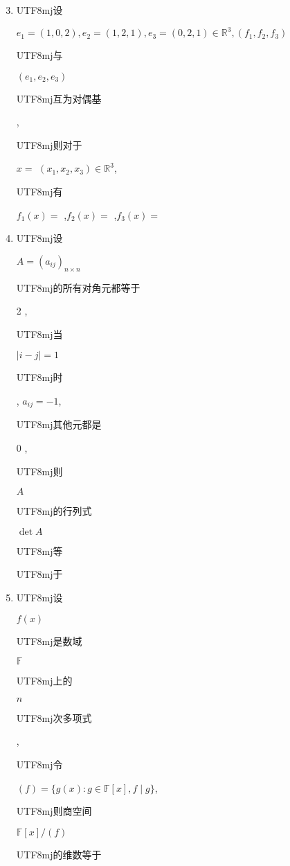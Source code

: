 \documentclass[10pt]{article}
\begin{document}
\begin{enumerate}
  \setcounter{enumi}{2}
  \item \begin{CJK}{UTF8}{mj}设\end{CJK} $e_{1}=(1,0,2), e_{2}=(1,2,1), e_{3}=(0,2,1) \in \mathbb{R}^{3},\left(f_{1}, f_{2}, f_{3}\right)$ \begin{CJK}{UTF8}{mj}与\end{CJK} $\left(e_{1}, e_{2}, e_{3}\right)$ \begin{CJK}{UTF8}{mj}互为对偶基\end{CJK}, \begin{CJK}{UTF8}{mj}则对于\end{CJK} $x=$ $\left(x_{1}, x_{2}, x_{3}\right) \in \mathbb{R}^{3}$, \begin{CJK}{UTF8}{mj}有\end{CJK} $f_{1}(x)=$ ,$f_{2}(x)=$ ,$f_{3}(x)=$

  \item \begin{CJK}{UTF8}{mj}设\end{CJK} $A=\left(a_{i j}\right)_{n \times n}$ \begin{CJK}{UTF8}{mj}的所有对角元都等于\end{CJK} 2 , \begin{CJK}{UTF8}{mj}当\end{CJK} $|i-j|=1$ \begin{CJK}{UTF8}{mj}时\end{CJK}, $a_{i j}=-1$, \begin{CJK}{UTF8}{mj}其他元都是\end{CJK} 0 , \begin{CJK}{UTF8}{mj}则\end{CJK} $A$ \begin{CJK}{UTF8}{mj}的行列式\end{CJK} $\operatorname{det} A$ \begin{CJK}{UTF8}{mj}等\end{CJK} \begin{CJK}{UTF8}{mj}于\end{CJK}

  \item \begin{CJK}{UTF8}{mj}设\end{CJK} $f(x)$ \begin{CJK}{UTF8}{mj}是数域\end{CJK} $\mathbb{F}$ \begin{CJK}{UTF8}{mj}上的\end{CJK} $n$ \begin{CJK}{UTF8}{mj}次多项式\end{CJK}, \begin{CJK}{UTF8}{mj}令\end{CJK} $(f)=\{g(x): g \in \mathbb{F}[x], f \mid g\}$, \begin{CJK}{UTF8}{mj}则商空间\end{CJK} $\mathbb{F}[x] /(f)$ \begin{CJK}{UTF8}{mj}的维数等于\end{CJK}


\end{enumerate}
\end{document}
